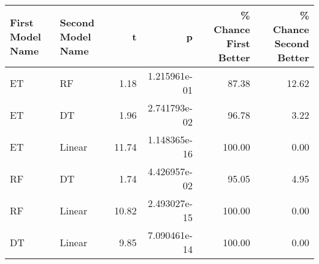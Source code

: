 \begin{tabular}{llrrrr}
\toprule
First Model Name & Second Model Name &     t &            p &  \% Chance First Better &  \% Chance Second Better \\
\midrule
              ET &                RF &  1.18 & 1.215961e-01 &                  87.38 &                   12.62 \\
              ET &                DT &  1.96 & 2.741793e-02 &                  96.78 &                    3.22 \\
              ET &            Linear & 11.74 & 1.148365e-16 &                 100.00 &                    0.00 \\
              RF &                DT &  1.74 & 4.426957e-02 &                  95.05 &                    4.95 \\
              RF &            Linear & 10.82 & 2.493027e-15 &                 100.00 &                    0.00 \\
              DT &            Linear &  9.85 & 7.090461e-14 &                 100.00 &                    0.00 \\
\bottomrule
\end{tabular}
